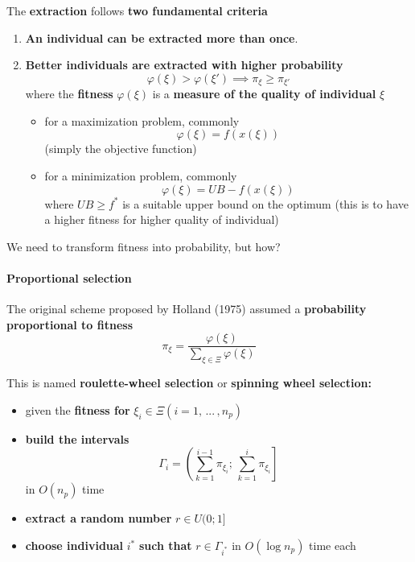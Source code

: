 The \textbf{extraction} follows \textbf{two fundamental criteria}
\begin{enumerate}
	\item \textbf{An individual can be extracted more than once}.\\
	
	\item \textbf{Better individuals are extracted with higher probability}
	$$ \varphi (\xi) > \varphi (\xi') \implies \pi_{\xi} \geq \pi_{\xi'} $$
	where the \textbf{fitness} $\varphi (\xi)$ is a \textbf{measure of the quality of individual} $\xi$
	\begin{itemize}
		\item for a maximization problem, commonly
		$$ \varphi (\xi) = f (x(\xi)) $$
		(simply the objective function)
		
		\item for a minimization problem, commonly
		$$ \varphi (\xi) = UB - f (x (\xi)) $$
		where $UB \geq f^\ast$ is a suitable upper bound on the optimum (this is to have a higher fitness for higher quality of individual)
	\end{itemize}
\end{enumerate}

We need to transform fitness into probability, but how? \\

\newpage

\paragraph{Proportional selection}
The original scheme proposed by Holland (1975) assumed a \textbf{probability proportional to fitness}
$$ \pi_{\xi} = \frac{\varphi (\xi)}{\sum_{\xi \in \Xi} \varphi (\xi)} $$

This is named \textbf{roulette-wheel selection} or \textbf{spinning wheel selection:}
\begin{itemize}
	\item given the \textbf{fitness for} $\xi_i \in \Xi (i = 1, \, ... \, , n_p )$
	
	\item \textbf{build the intervals} 
	$$ \Gamma_i = \left( \sum_{k=1}^{i-1} \pi_{\xi_i}; \, \sum_{k=1}^{i} \pi_{\xi_i} \right] $$
	in $O (n_p )$ time
	
	\item \textbf{extract a random number} $r \in U (0; 1]$
	
	\item \textbf{choose individual} $i^\ast$ \textbf{such that} $r \in \Gamma_{i^\ast}$ in $O (\log n_p )$ time each
\end{itemize}

